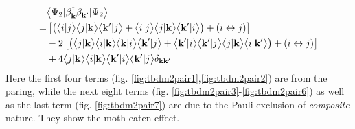\begin{equation}\label{eq:tbdm2pair}
\begin{split}
 &\avv[\Psi_2]{\beta_\vk^\dg\beta_{\vk'}^{}}\\
=&\mbr{\br{\avt{i}{j}\avt{j}{\vk}\avt{\vk'}{j}+\avt{i}{j}\avt{j}{\vk}\avt{\vk'}{i}}+(i\leftrightarrow{}j)}\\
  &-2\mbr{\br{\avt{j}{\vk}\avt{i}{\vk}\avt{\vk}{i}\avt{\vk'}{j}+\avt{\vk'}{i}\avt{\vk'}{j}\avt{j}{\vk}\avt{i}{\vk'}}+(i\leftrightarrow{}j)}\\
&+4\avt{j}{\vk}\avt{i}{\vk}\avt{\vk'}{i}\avt{\vk'}{j}\delta_{\vk\vk'}
\end{split}
\end{equation}
Here the first four terms (fig. \ref{fig:tbdm2pair1},\ref{fig:tbdm2pair2}) are from the paring, while the next eight terms (fig. \ref{fig:tbdm2pair3}-\ref{fig:tbdm2pair6}) as well as the last term  (fig. \ref{fig:tbdm2pair7}) are due to the Pauli exclusion of \emph{composite} nature. They show the moth-eaten effect.
